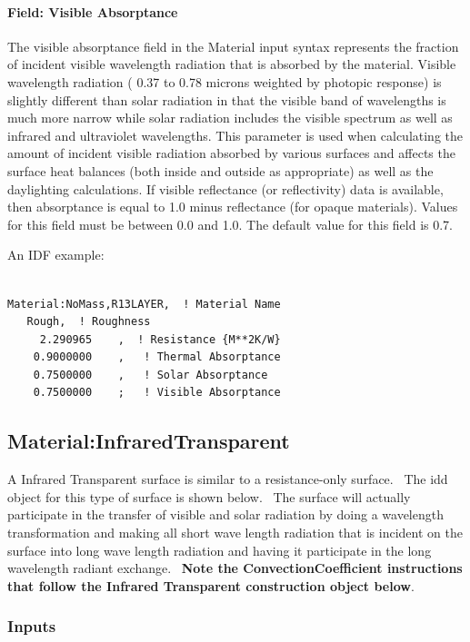 \paragraph{Field: Visible Absorptance}\label{field-visible-absorptance-1}

The visible absorptance field in the Material input syntax represents the fraction of incident visible wavelength radiation that is absorbed by the material. Visible wavelength radiation ( 0.37 to 0.78 microns weighted by photopic response) is slightly different than solar radiation in that the visible band of wavelengths is much more narrow while solar radiation includes the visible spectrum as well as infrared and ultraviolet wavelengths. This parameter is used when calculating the amount of incident visible radiation absorbed by various surfaces and affects the surface heat balances (both inside and outside as appropriate) as well as the daylighting calculations. If visible reflectance (or reflectivity) data is available, then absorptance is equal to 1.0 minus reflectance (for opaque materials). Values for this field must be between 0.0 and 1.0. The default value for this field is 0.7.

An IDF example:

\begin{lstlisting}

Material:NoMass,R13LAYER,  ! Material Name
   Rough,  ! Roughness
     2.290965    ,  ! Resistance {M**2K/W}
    0.9000000    ,   ! Thermal Absorptance
    0.7500000    ,   ! Solar Absorptance
    0.7500000    ;   ! Visible Absorptance
\end{lstlisting}

\subsection{Material:InfraredTransparent}\label{materialinfraredtransparent}

A Infrared Transparent surface is similar to a resistance-only surface.~ The idd object for this type of surface is shown below.~ The surface will actually participate in the transfer of visible and solar radiation by doing a wavelength transformation and making all short wave length radiation that is incident on the surface into long wave length radiation and having it participate in the long wavelength radiant exchange.~ \textbf{Note the ConvectionCoefficient instructions that follow the Infrared Transparent construction object below}.

\subsubsection{Inputs}\label{inputs-2-040}

